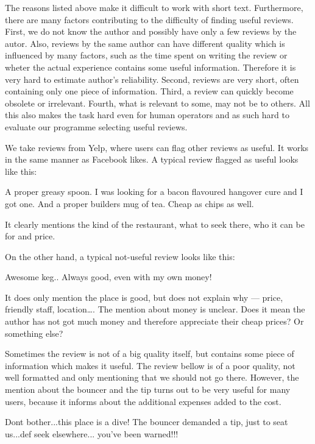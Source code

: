 The reasons listed above make it difficult to work with short text.
Furthermore, there are many factors contributing to the difficulty of finding useful reviews.
First, we do not know the author and possibly have only a few reviews by the autor.
Also, reviews by the same author can have different quality which is influenced by many factors,
such as the time spent on writing the review or wheter the actual experience contains some useful information.
Therefore it is very hard to estimate author's reliability.
Second, reviews are very short, often containing only one piece of information.
Third, a review can quickly become obsolete or irrelevant.
Fourth, what is relevant to some, may not be to others.
All this also makes the task hard even for human operators and as such hard to evaluate our programme selecting useful reviews.

We take reviews from Yelp, where users can flag other reviews as useful.
It works in the same manner as Facebook likes.
A typical review flagged as useful looks like this:

\begin{code}
A proper greasy spoon.
I was looking for a bacon flavoured hangover cure and I got one.
And a proper builders mug of tea.
Cheap as chips as well.
\end{code}

It clearly mentions the kind of the restaurant, what to seek there,
who it can be for and price.

On the other hand, a typical not-useful review looks like this:

\begin{code}
Awesome keg.. Always good, even with my own money!
\end{code}

It does only mention the place is good, but does not explain why --- price, friendly staff, location\dots.
The mention about money is unclear.
Does it mean the author has not got much money and therefore appreciate their cheap prices? Or something else?

Sometimes the review is not of a big quality itself, but contains some piece of information which makes it useful.
The review bellow is of a poor quality, not well formatted and only mentioning that we should not go there.
However, the mention about the bouncer and the tip turns out to be very useful for many users,
because it informs about the additional expenses added to the cost.

\begin{code}
Dont bother...this place is a dive!
The bouncer demanded a tip, just to seat us...def seek elsewhere...
you've been warned!!!
\end{code}

